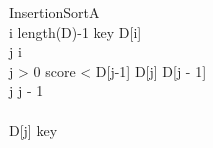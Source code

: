 \begin{pseudocode}{InsertionSort}{A}
	\label{InsertionSort}
	\\
	\FOR i \TO length(D)-1 \DO
	\BEGIN
		key \GETS D[i]\\
		j \GETS i\\
		\WHILE j > 0 \AND score < D[j-1] \DO
		\BEGIN
			D[j] \GETS D[j - 1]\\
			j \GETS j - 1\\
		\END \\
		D[j] \GETS key \\
	\END	
		
\end{pseudocode}






